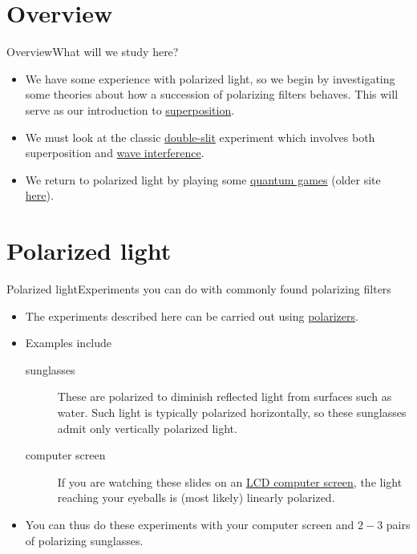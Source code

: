 
\section{Overview}
\begin{frame}{Overview}{What will we study here?}
\begin{itemize}
    \item We have some experience with polarized light, so we begin by investigating some theories about how a succession of polarizing filters behaves.  This will serve as our introduction to \href{https://en.wikipedia.org/wiki/Quantum_superposition}{superposition}.
    \item We must look at the classic \href{https://en.wikipedia.org/wiki/Double-slit_experiment}{double-slit} experiment which involves both superposition and \href{https://en.wikipedia.org/wiki/Wave_interference}{wave interference}.
    \item We return to polarized light by playing some \href{https://lab.quantumflytrap.com/lab}{quantum games} (older site \href{http://play.quantumgame.io/}{here}).
\end{itemize}
    
\end{frame}
\section{Polarized light}

\begin{frame}{Polarized light}{Experiments you can do with commonly found polarizing filters}
\begin{itemize}
    \item The experiments described here can be carried out using \href{https://en.wikipedia.org/wiki/Polarizer}{polarizers}.
    \item Examples include
    \begin{description}
        \item[sunglasses] These are polarized to diminish reflected light from surfaces such as water.  Such light is typically polarized horizontally, so these sunglasses admit only vertically polarized light.
        \item[computer screen]  If you are watching these slides on an \href{https://en.wikipedia.org/wiki/Liquid-crystal_display}{LCD computer screen}, the light reaching your eyeballs is (most likely) linearly polarized.
    \end{description}
    \item You can thus do these experiments with your computer screen and $2-3$ pairs of polarizing sunglasses.
    
\end{itemize}
\end{frame}

